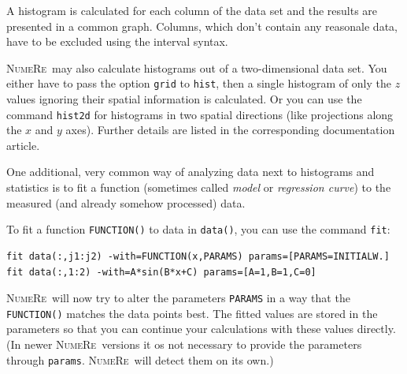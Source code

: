 \documentclass[DIV=14,headsepline,footsepline]{scrbook}
\newcommand{\NR}{\textsc{Nu\-me\-Re}}
\begin{document}
				A histogram is calculated for each column of the data set and the results are presented in a common graph. Columns, which don't contain any reasonale data, have to be excluded using the interval syntax.
				
				\NR\ may also calculate histograms out of a two-dimensional data set. You either have to pass the option \verb+grid+ to \verb+hist+, then a single histogram of only the $z$ values ignoring their spatial information is calculated. Or you can use the command \verb+hist2d+ for histograms in two spatial directions (like projections along the $x$ and $y$ axes). Further details are listed in the corresponding documentation article.
				
				One additional, very common way of analyzing data next to histograms and statistics is to fit a function (sometimes called \emph{model} or \emph{regression curve}) to the measured (and already somehow processed) data.
				
				To fit a function \verb+FUNCTION()+ to data in \verb+data()+, you can use the command \verb+fit+:
				\begin{lstlisting}
fit data(:,j1:j2) -with=FUNCTION(x,PARAMS) params=[PARAMS=INITIALW.]
fit data(:,1:2) -with=A*sin(B*x+C) params=[A=1,B=1,C=0]
				\end{lstlisting}
				\NR\ will now try to alter the parameters \verb+PARAMS+ in a way that the \verb+FUNCTION()+ matches the data points best. The fitted values are stored in the parameters so that you can continue your calculations with these values directly. (In newer \NR\ versions it os not necessary to provide the parameters through \verb+params+. \NR\ will detect them on its own.)
				
\end{document}
